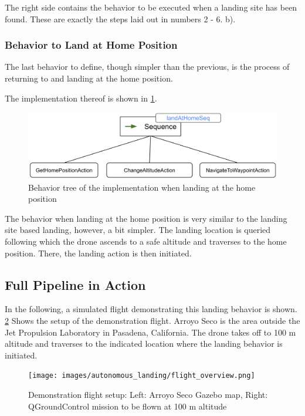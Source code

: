 The right side contains the behavior to be executed when a landing site has been found. These are exactly the steps laid out in numbers 2 - 6. b).


\subsubsection{Behavior to Land at Home Position}

The last behavior to define, though simpler than the previous, is the process of returning to and landing at the home position. 

The implementation thereof is shown in \cref{fig:bt_land_at_home}.

\begin{figure}[h]
\centering
\includegraphics[scale=0.2]{images/autonomous_landing/land_at_home_beh.png}
\caption{Behavior tree of the implementation when landing at the home position}
\label{fig:bt_land_at_home}
\end{figure}

The behavior when landing at the home position is very similar to the landing site based landing, however, a bit simpler. The landing location is queried following which the drone ascends to a safe altitude and traverses to the home position. There, the landing action is then initiated.

\subsection{Full Pipeline in Action}

In the following, a simulated flight demonstrating this landing behavior is shown. \cref{fig:demo_flight_setup} Shows the setup of the demonstration flight. Arroyo Seco is the area outside the Jet Propulsion Laboratory in Pasadena, California. The drone takes off to 100 m altitude and traverses to the indicated location where the landing behavior is initiated.

\begin{figure}[h]
\centering
\texttt{[image: images/autonomous\_landing/flight\_overview.png]}
\caption{Demonstration flight setup: Left: Arroyo Seco Gazebo map, Right: QGroundControl mission to be flown at 100 m altitude}
\label{fig:demo_flight_setup}
\end{figure}

